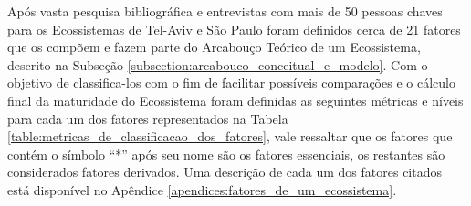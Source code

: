 Após vasta pesquisa bibliográfica e entrevistas com mais de 50 pessoas chaves para os Ecossistemas de Tel-Aviv e São Paulo foram definidos cerca de 21 fatores que os compõem e fazem parte do Arcabouço Teórico de um Ecossistema, descrito na Subseção \ref{subsection:arcabouco_conceitual_e_modelo}. Com o objetivo de classifica-los com o fim de facilitar possíveis comparações e o cálculo final da maturidade do Ecossistema foram definidas as seguintes métricas e níveis para cada um dos fatores representados na Tabela \ref{table:metricas_de_classificacao_dos_fatores}, vale ressaltar que os fatores que contém o símbolo ``*''  após seu nome são os fatores essenciais, os restantes são considerados fatores derivados. Uma descrição de cada um dos fatores citados está disponível no Apêndice \ref{apendices:fatores_de_um_ecossistema}.

